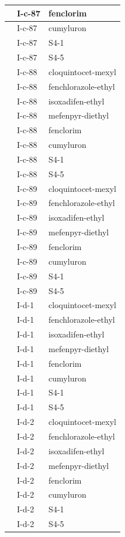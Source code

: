 \documentclass[11pt,a4paper]{article}
\begin{document}
\begin{table}[h]
\begin{tabular}{|l|l|l|}
 & I-c-87 & fenclorim \\ \hline
 & I-c-87 & cumyluron \\ \hline
 & I-c-87 & S4-1 \\ \hline
 & I-c-87 & S4-5 \\ \hline
 & I-c-88 & cloquintocet-mexyl \\ \hline
 & I-c-88 & fenchlorazole-ethyl \\ \hline
 & I-c-88 & isoxadifen-ethyl \\ \hline
 & I-c-88 & mefenpyr-diethyl \\ \hline
 & I-c-88 & fenclorim \\ \hline
 & I-c-88 & cumyluron \\ \hline
 & I-c-88 & S4-1 \\ \hline
 & I-c-88 & S4-5 \\ \hline
 & I-c-89 & cloquintocet-mexyl \\ \hline
 & I-c-89 & fenchlorazole-ethyl \\ \hline
 & I-c-89 & isoxadifen-ethyl \\ \hline
 & I-c-89 & mefenpyr-diethyl \\ \hline
 & I-c-89 & fenclorim \\ \hline
 & I-c-89 & cumyluron \\ \hline
 & I-c-89 & S4-1 \\ \hline
 & I-c-89 & S4-5 \\ \hline
 & I-d-1 & cloquintocet-mexyl \\ \hline
 & I-d-1 & fenchlorazole-ethyl \\ \hline
 & I-d-1 & isoxadifen-ethyl \\ \hline
 & I-d-1 & mefenpyr-diethyl \\ \hline
 & I-d-1 & fenclorim \\ \hline
 & I-d-1 & cumyluron \\ \hline
 & I-d-1 & S4-1 \\ \hline
 & I-d-1 & S4-5 \\ \hline
 & I-d-2 & cloquintocet-mexyl \\ \hline
 & I-d-2 & fenchlorazole-ethyl \\ \hline
 & I-d-2 & isoxadifen-ethyl \\ \hline
 & I-d-2 & mefenpyr-diethyl \\ \hline
 & I-d-2 & fenclorim \\ \hline
 & I-d-2 & cumyluron \\ \hline
 & I-d-2 & S4-1 \\ \hline
 & I-d-2 & S4-5 \\ \hline

\end{tabular}
\end{table}
\end{document}
